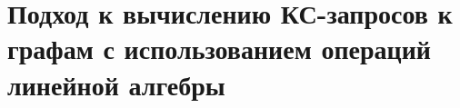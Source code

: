 \chapter{Подход к вычислению КС-запросов к графам с использованием операций линейной алгебры}\label{ch:ch2}


\FloatBarrier
